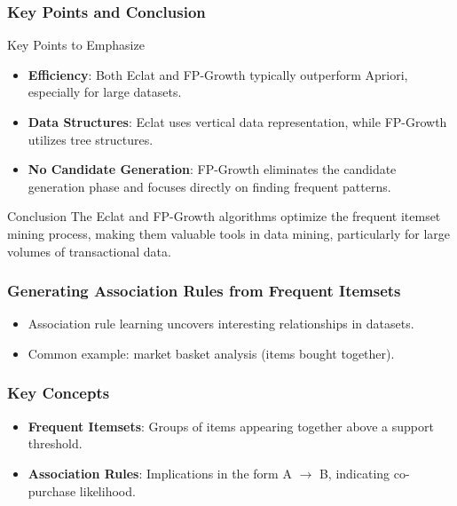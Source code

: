 \documentclass{beamer}
\begin{document}
\begin{frame}[fragile]
    \frametitle{Key Points and Conclusion}
    \begin{block}{Key Points to Emphasize}
        \begin{itemize}
            \item \textbf{Efficiency}: Both Eclat and FP-Growth typically outperform Apriori, especially for large datasets.
            \item \textbf{Data Structures}: Eclat uses vertical data representation, while FP-Growth utilizes tree structures.
            \item \textbf{No Candidate Generation}: FP-Growth eliminates the candidate generation phase and focuses directly on finding frequent patterns.
        \end{itemize}
    \end{block}

    \begin{block}{Conclusion}
        The Eclat and FP-Growth algorithms optimize the frequent itemset mining process, making them valuable tools in data mining, particularly for large volumes of transactional data.
    \end{block}
\end{frame}

\begin{frame}[fragile]
    \frametitle{Generating Association Rules from Frequent Itemsets}
    \begin{itemize}
        \item Association rule learning uncovers interesting relationships in datasets.
        \item Common example: market basket analysis (items bought together).
    \end{itemize}
\end{frame}

\begin{frame}[fragile]
    \frametitle{Key Concepts}
    \begin{itemize}
        \item \textbf{Frequent Itemsets}: Groups of items appearing together above a support threshold.
        \item \textbf{Association Rules}: Implications in the form A $\to$ B, indicating co-purchase likelihood.
    \end{itemize}
\end{frame}
\end{document}

